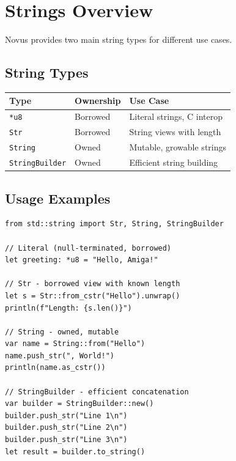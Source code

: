 \section{Strings Overview}
\label{sec:stdlib-strings}

Novus provides two main string types for different use cases.

\subsection{String Types}

\begin{center}
\begin{tabular}{llp{6cm}}
\textbf{Type} & \textbf{Ownership} & \textbf{Use Case} \\
\hline
\texttt{*u8} & Borrowed & Literal strings, C interop \\
\texttt{Str} & Borrowed & String views with length \\
\texttt{String} & Owned & Mutable, growable strings \\
\texttt{StringBuilder} & Owned & Efficient string building \\
\end{tabular}
\end{center}

\subsection{Usage Examples}

\begin{lstlisting}
from std::string import Str, String, StringBuilder

// Literal (null-terminated, borrowed)
let greeting: *u8 = "Hello, Amiga!"

// Str - borrowed view with known length
let s = Str::from_cstr("Hello").unwrap()
println(f"Length: {s.len()}")

// String - owned, mutable
var name = String::from("Hello")
name.push_str(", World!")
println(name.as_cstr())

// StringBuilder - efficient concatenation
var builder = StringBuilder::new()
builder.push_str("Line 1\n")
builder.push_str("Line 2\n")
builder.push_str("Line 3\n")
let result = builder.to_string()
\end{lstlisting}

